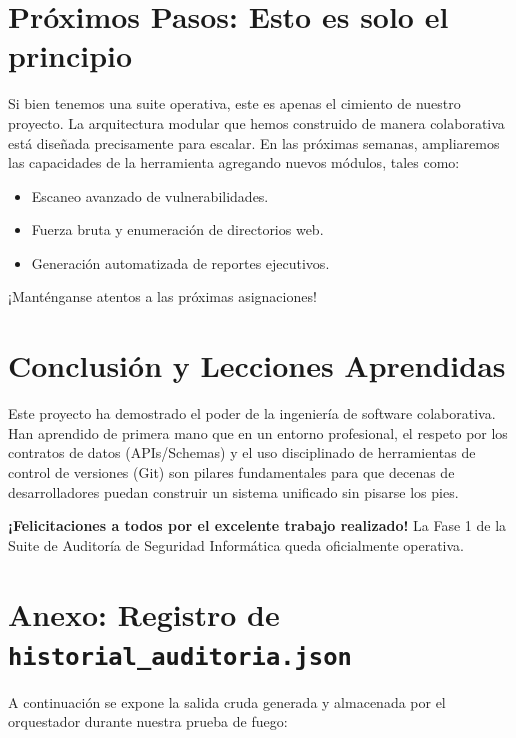 \documentclass[12pt,a4paper]{article}
\begin{document}
\section*{Próximos Pasos: Esto es solo el principio}

Si bien tenemos una suite operativa, este es apenas el cimiento de nuestro proyecto. La arquitectura modular que hemos construido de manera colaborativa está diseñada precisamente para escalar. En las próximas semanas, ampliaremos las capacidades de la herramienta agregando nuevos módulos, tales como:

\begin{itemize}[label=$\bullet$]
    \item Escaneo avanzado de vulnerabilidades.
    \item Fuerza bruta y enumeración de directorios web.
    \item Generación automatizada de reportes ejecutivos.
\end{itemize}

¡Manténganse atentos a las próximas asignaciones!

\section*{Conclusión y Lecciones Aprendidas}

Este proyecto ha demostrado el poder de la ingeniería de software colaborativa. Han aprendido de primera mano que en un entorno profesional, el respeto por los contratos de datos (APIs/Schemas) y el uso disciplinado de herramientas de control de versiones (Git) son pilares fundamentales para que decenas de desarrolladores puedan construir un sistema unificado sin pisarse los pies.

\vspace{1cm}
\noindent \textbf{¡Felicitaciones a todos por el excelente trabajo realizado!} \newline
La Fase 1 de la Suite de Auditoría de Seguridad Informática queda oficialmente operativa.

\newpage
\section*{Anexo: Registro de \texttt{historial\_auditoria.json}}
A continuación se expone la salida cruda generada y almacenada por el orquestador durante nuestra prueba de fuego:

\end{document}
